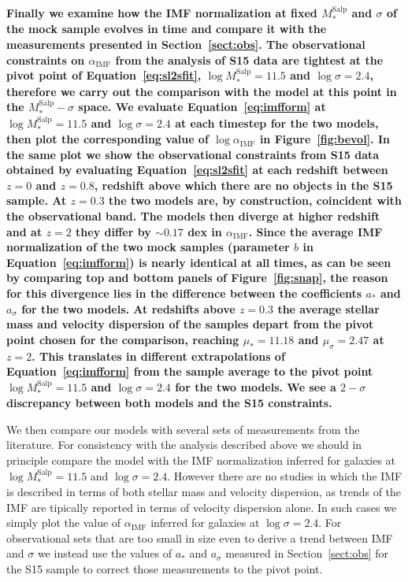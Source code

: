 \documentclass[usenatbib, letters]{mnras}
\def\msalp{M_*^{\mathrm{Salp}}}
\def\aimf{\alpha_{\mathrm{IMF}}}
\def\Sref#1{Section~\ref{#1}\xspace}
\def\Fref#1{Figure~\ref{#1}\xspace}
\def\Eref#1{Equation~\ref{#1}\xspace}
\begin{document}

{\bf 
Finally we examine how the IMF normalization at fixed $\msalp$ and $\sigma$ of the mock sample evolves in time and compare it with the measurements presented in \Sref{sect:obs}.
The observational constraints on $\aimf$ from the analysis of S15 data are tightest at the pivot point of \Eref{eq:sl2sfit}, $\log{\msalp} = 11.5$ and $\log{\sigma} = 2.4$, therefore we carry out the comparison with the model at this point in the $\msalp-\sigma$ space.
We evaluate \Eref{eq:imfform} at $\log{\msalp} = 11.5$ and $\log{\sigma} = 2.4$ at each timestep for the two models, then plot the corresponding value of $\log{\aimf}$ in \Fref{fig:bevol}. 
In the same plot we show the observational constraints from S15 data obtained by evaluating \Eref{eq:sl2sfit} at each redshift between $z=0$ and $z=0.8$, redshift above which there are no objects in the S15 sample.
At $z=0.3$ the two models are, by construction, coincident with the observational band. The models then diverge at higher redshift and at $z=2$ they differ by $\sim 0.17$ dex in $\aimf$.
Since the average IMF normalization of the two mock samples (parameter $b$ in \Eref{eq:imfform}) is nearly identical at all times, as can be seen by comparing top and bottom panels of \Fref{fig:snap}, 
the reason for this divergence lies in the difference between the coefficients $a_*$ and $a_\sigma$ for the two models.
At redshifts above $z=0.3$ the average stellar mass and velocity dispersion of the samples depart from the pivot point chosen for the comparison, reaching $\mu_*=11.18$ and $\mu_\sigma=2.47$ at $z=2$.
This translates in different extrapolations of \Eref{eq:imfform} from the sample average to the pivot point $\log{\msalp}=11.5$ and $\log{\sigma}=2.4$ for the two models.
We see a $2-\sigma$ discrepancy between both models and the S15 constraints.

We then compare our models with several sets of measurements from the literature.
For consistency with the analysis described above we should in principle compare the model with the IMF normalization inferred for galaxies at $\log{\msalp}=11.5$ and $\log{\sigma}=2.4$.
However there are no studies in which the IMF is described in terms of both stellar mass and velocity dispersion, as trends of the IMF are tipically reported in terms of velocity dispersion alone.
In such cases we simply plot the value of $\aimf$ inferred for galaxies at $\log{\sigma}=2.4$.
For observational sets that are too small in size even to derive a trend between IMF and $\sigma$ we instead use the values of $a_*$ and $a_\sigma$ measured in \Sref{sect:obs} for the S15 sample to correct those measurements to the pivot point.

}
\end{document}
